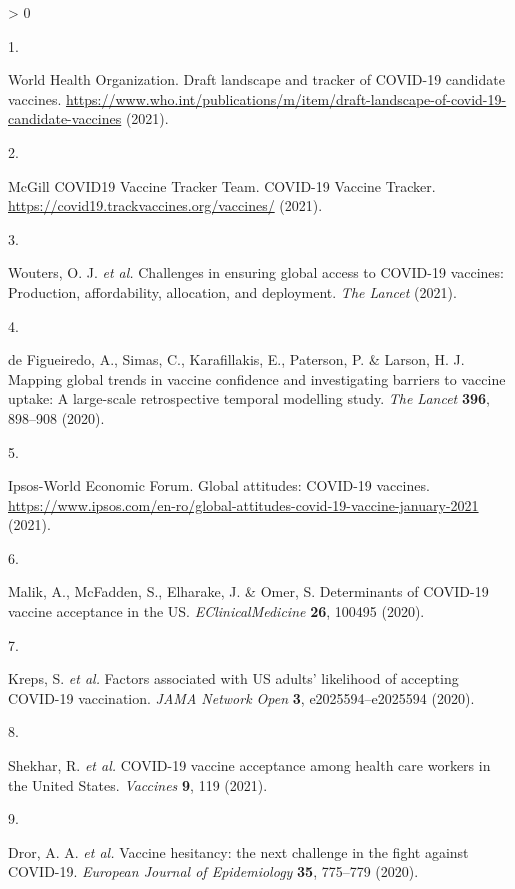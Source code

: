 \documentclass[
  12pt,
]{article}
\newlength{\cslhangindent}
\newlength{\csllabelwidth}
\newenvironment{CSLReferences}[2] %
 {%
  \setlength{\parindent}{0pt}
  \ifodd #1 \everypar{\setlength{\hangindent}{\cslhangindent}}\ignorespaces\fi
  \ifnum #2 > 0
  \setlength{\parskip}{#2\baselineskip}
  \fi
 }%
 {}
\newcommand{\CSLLeftMargin}[1]{\parbox[t]{\csllabelwidth}{#1}}
\newcommand{\CSLRightInline}[1]{\parbox[t]{\linewidth - \csllabelwidth}{#1}\break}
\begin{document}
\hypertarget{refs}{}
\begin{CSLReferences}{0}{0}
\leavevmode\hypertarget{ref-who1}{}%
\CSLLeftMargin{1. }
\CSLRightInline{World Health Organization. {Draft landscape and tracker of COVID-19 candidate vaccines}. \url{https://www.who.int/publications/m/item/draft-landscape-of-covid-19-candidate-vaccines} (2021).}

\leavevmode\hypertarget{ref-track}{}%
\CSLLeftMargin{2. }
\CSLRightInline{McGill COVID19 Vaccine Tracker Team. {COVID-19 Vaccine Tracker}. \url{https://covid19.trackvaccines.org/vaccines/} (2021).}

\leavevmode\hypertarget{ref-wouters2021challenges}{}%
\CSLLeftMargin{3. }
\CSLRightInline{Wouters, O. J. \emph{et al.} Challenges in ensuring global access to COVID-19 vaccines: Production, affordability, allocation, and deployment. \emph{The Lancet} (2021).}

\leavevmode\hypertarget{ref-defigueiredo2020lancet}{}%
\CSLLeftMargin{4. }
\CSLRightInline{de Figueiredo, A., Simas, C., Karafillakis, E., Paterson, P. \& Larson, H. J. Mapping global trends in vaccine confidence and investigating barriers to vaccine uptake: A large-scale retrospective temporal modelling study. \emph{The Lancet} \textbf{396}, 898--908 (2020).}

\leavevmode\hypertarget{ref-boyon2020ipsos}{}%
\CSLLeftMargin{5. }
\CSLRightInline{Ipsos-World Economic Forum. {Global attitudes: COVID-19 vaccines}. \url{https://www.ipsos.com/en-ro/global-attitudes-covid-19-vaccine-january-2021} (2021).}

\leavevmode\hypertarget{ref-Malik2020}{}%
\CSLLeftMargin{6. }
\CSLRightInline{Malik, A., McFadden, S., Elharake, J. \& Omer, S. {Determinants of COVID-19 vaccine acceptance in the US}. \emph{EClinicalMedicine} \textbf{26}, 100495 (2020).}

\leavevmode\hypertarget{ref-kreps2020factors}{}%
\CSLLeftMargin{7. }
\CSLRightInline{Kreps, S. \emph{et al.} {Factors associated with US adults' likelihood of accepting COVID-19 vaccination}. \emph{JAMA Network Open} \textbf{3}, e2025594--e2025594 (2020).}

\leavevmode\hypertarget{ref-shekhar2021covid}{}%
\CSLLeftMargin{8. }
\CSLRightInline{Shekhar, R. \emph{et al.} {COVID-19 vaccine acceptance among health care workers in the United States}. \emph{Vaccines} \textbf{9}, 119 (2021).}

\leavevmode\hypertarget{ref-dror2020vaccine}{}%
\CSLLeftMargin{9. }
\CSLRightInline{Dror, A. A. \emph{et al.} {Vaccine hesitancy: the next challenge in the fight against COVID-19}. \emph{{European Journal of Epidemiology}} \textbf{35}, 775--779 (2020).}


\end{CSLReferences}
\end{document}
